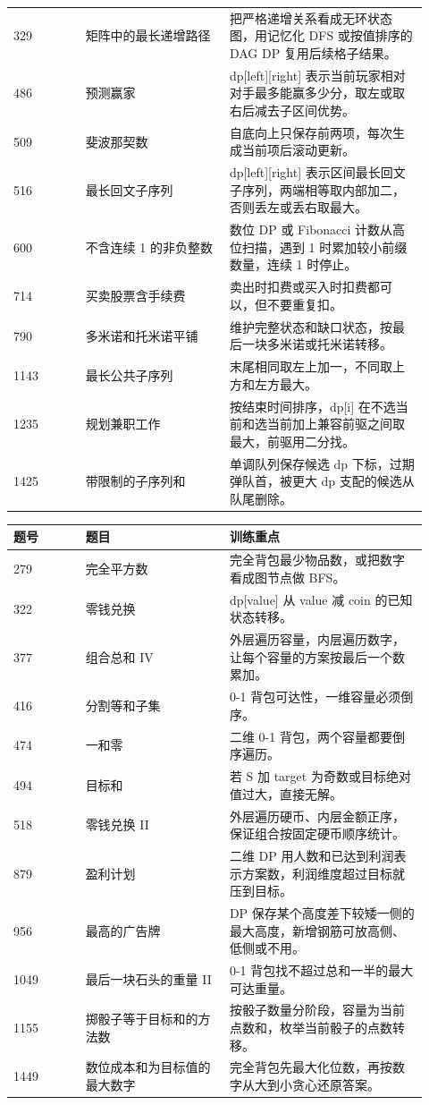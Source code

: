 \begin{longtable}{@{}p{0.16\linewidth}p{0.32\linewidth}p{0.44\linewidth}@{}}
329 & 矩阵中的最长递增路径 & 把严格递增关系看成无环状态图，用记忆化 DFS 或按值排序的 DAG DP 复用后续格子结果。\\
486 & 预测赢家 & dp[left][right] 表示当前玩家相对对手最多能赢多少分，取左或取右后减去子区间优势。\\
509 & 斐波那契数 & 自底向上只保存前两项，每次生成当前项后滚动更新。\\
516 & 最长回文子序列 & dp[left][right] 表示区间最长回文子序列，两端相等取内部加二，否则丢左或丢右取最大。\\
600 & 不含连续 1 的非负整数 & 数位 DP 或 Fibonacci 计数从高位扫描，遇到 1 时累加较小前缀数量，连续 1 时停止。\\
714 & 买卖股票含手续费 & 卖出时扣费或买入时扣费都可以，但不要重复扣。\\
790 & 多米诺和托米诺平铺 & 维护完整状态和缺口状态，按最后一块多米诺或托米诺转移。\\
1143 & 最长公共子序列 & 末尾相同取左上加一，不同取上方和左方最大。\\
1235 & 规划兼职工作 & 按结束时间排序，dp[i] 在不选当前和选当前加上兼容前驱之间取最大，前驱用二分找。\\
1425 & 带限制的子序列和 & 单调队列保存候选 dp 下标，过期弹队首，被更大 dp 支配的候选从队尾删除。\\
\bottomrule
\end{longtable}


\begin{longtable}{@{}p{0.16\linewidth}p{0.32\linewidth}p{0.44\linewidth}@{}}
\toprule
题号 & 题目 & 训练重点\\
\midrule
\endhead
279 & 完全平方数 & 完全背包最少物品数，或把数字看成图节点做 BFS。\\
322 & 零钱兑换 & dp[value] 从 value 减 coin 的已知状态转移。\\
377 & 组合总和 IV & 外层遍历容量，内层遍历数字，让每个容量的方案按最后一个数累加。\\
416 & 分割等和子集 & 0-1 背包可达性，一维容量必须倒序。\\
474 & 一和零 & 二维 0-1 背包，两个容量都要倒序遍历。\\
494 & 目标和 & 若 S 加 target 为奇数或目标绝对值过大，直接无解。\\
518 & 零钱兑换 II & 外层遍历硬币、内层金额正序，保证组合按固定硬币顺序统计。\\
879 & 盈利计划 & 二维 DP 用人数和已达到利润表示方案数，利润维度超过目标就压到目标。\\
956 & 最高的广告牌 & DP 保存某个高度差下较矮一侧的最大高度，新增钢筋可放高侧、低侧或不用。\\
1049 & 最后一块石头的重量 II & 0-1 背包找不超过总和一半的最大可达重量。\\
1155 & 掷骰子等于目标和的方法数 & 按骰子数量分阶段，容量为当前点数和，枚举当前骰子的点数转移。\\
1449 & 数位成本和为目标值的最大数字 & 完全背包先最大化位数，再按数字从大到小贪心还原答案。\\
\bottomrule
\end{longtable}


